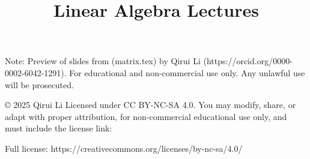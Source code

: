 
\title{Linear Algebra Lectures}


\date{}


Note: Preview of slides from (matrix.tex) by Qirui Li (https://orcid.org/0000-0002-6042-1291).  
For educational and non-commercial use only. Any unlawful use will be prosecuted.

© 2025 Qirui Li  
Licensed under CC BY-NC-SA 4.0.  
You may modify, share, or adapt with proper attribution, for non-commercial educational use only, and must include the license link:  

Full license: https://creativecommons.org/licenses/by-nc-sa/4.0/



%

%

%




%
%
%


%

%

%
%


%

%


%



%

%


%

%

%


%


%



%



%


%


